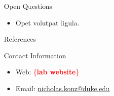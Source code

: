 \documentclass[final,hyperref={pdfpagelabels=false}]{beamer}
\newcommand{\todo}[1]{\textcolor{red}{\{\textbf{#1}\}}}
\begin{document}
\begin{frame}[t]
\begin{columns}[t]
\begin{column}{.3\textwidth}
\begin{block}{Open Questions}

\begin{itemize}
\item Opet volutpat ligula.
\end{itemize}

\end{block}


\begin{block}{References}
        
\small{
}

\end{block}


\begin{block}{Contact Information}

\begin{itemize}
\item Web: \todo{lab website}
\item Email: \href{mailto:nicholas.konz@duke.edu}{nicholas.konz@duke.edu}
\end{itemize}

\end{block}
\end{column} %


\begin{column}{.015\textwidth}\end{column} %

\end{columns} %

\end{frame} %
\end{document}
